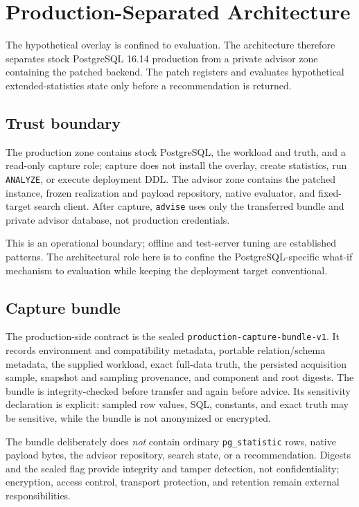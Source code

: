 \section{Production-Separated Architecture}

The hypothetical overlay is confined to evaluation.  The architecture
therefore separates stock
PostgreSQL 16.14 production from a private advisor zone containing the
patched backend.  The patch registers and evaluates hypothetical
extended-statistics state only before a recommendation is returned.

\subsection{Trust boundary}

The production zone contains stock PostgreSQL, the workload and truth, and a
read-only capture role; capture does not install the overlay, create
statistics, run \texttt{ANALYZE}, or execute deployment DDL.  The advisor zone
contains the patched instance, frozen realization and payload repository,
native evaluator, and fixed-target search client.  After capture,
\texttt{advise} uses only the transferred bundle and private advisor database,
not production credentials.

This is an operational boundary; offline and test-server tuning are
established patterns.  The architectural role here is to confine the
PostgreSQL-specific what-if mechanism to evaluation while keeping the
deployment target conventional.

\subsection{Capture bundle}

The production-side contract is the sealed
\texttt{production-capture-}\allowbreak\texttt{bundle-v1}.  It records environment and
compatibility metadata, portable relation/schema metadata, the supplied
workload, exact full-data truth, the persisted acquisition sample, snapshot
and sampling provenance, and component and root digests.  The bundle is
integrity-checked before transfer and again before advice.  Its sensitivity
declaration is explicit: sampled row values, SQL, constants, and exact truth
may be sensitive, while the bundle is not anonymized or encrypted.

The bundle deliberately does \emph{not} contain ordinary
\texttt{pg\_statistic} rows, native payload bytes, the advisor repository,
search state, or a recommendation.  Digests and the sealed flag provide
integrity and tamper detection, not confidentiality; encryption, access
control, transport protection, and retention remain external responsibilities.


